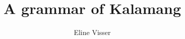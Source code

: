\author{Eline Visser}
\title{A grammar of Kalamang}
\subtitle{}
\renewcommand{\lsSeries}{dummyseries}
\renewcommand{\lsSeriesNumber}{ }
